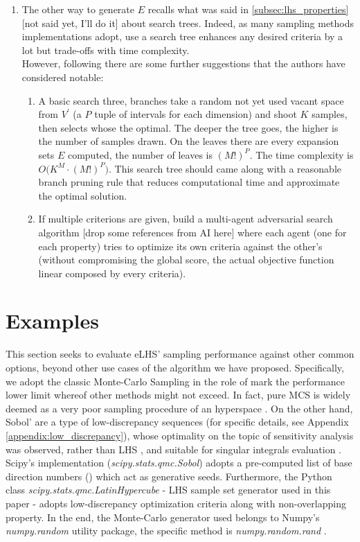 \documentclass[12pt]{extarticle}
\newcommand{\mappendixref}[1]{Appendix \ref{#1}}
\begin{document}
\begin{enumerate}
\begin{enumerate}
	\item The other way to generate $E$ recalls what was said in \cref{subsec:lhs_properties} [not said yet, I'll do it] about search trees. Indeed, as many sampling methods implementations adopt, use a search tree enhances any desired criteria by a lot but trade-offs with time complexity. \\
	However, following there are some further suggestions that the authors have considered notable:
	\begin{enumerate}
		\item A basic search three, branches take a random not yet used vacant space from $V^\prime$ (a $P$ tuple of intervals for each dimension) and shoot $K$ samples, then selects whose the optimal. The deeper the tree goes, the higher is the number of samples drawn. On the leaves there are every expansion sets $E$ computed, the number of leaves is $(M!)^P$. The time complexity is $O\big( K^M \cdot (M!)^P\big)$. This search tree should came along with a reasonable branch pruning rule that reduces computational time and approximate the optimal solution.
		
		\item If multiple criterions are given, build a multi-agent adversarial search algorithm [drop some references from AI here] where each agent (one for each property) tries to optimize its own criteria against the other's (without compromising the global score, the actual objective function linear composed by every criteria).
	
	\end{enumerate}
\end{enumerate}
\end{enumerate}


\section{Examples}
\label{sec:experiments}
This section seeks to evaluate eLHS' sampling performance against other common options, beyond other use cases of the algorithm we have proposed. Specifically, we adopt the classic Monte-Carlo Sampling in the role of mark the performance lower limit whereof other methods might not exceed. In fact, pure MCS is widely deemed as a very poor sampling procedure of an hyperspace . On the other hand, Sobol' are a type of low-discrepancy sequences (for specific details, see \mappendixref{appendix:low_discrepancy}), whose optimality on the topic of sensitivity analysis was observed, rather than LHS , and suitable for singular integrals evaluation . Scipy's implementation (\emph{scipy.stats.qmc.Sobol}) adopts a pre-computed list of base direction numbers () which act as generative seeds. Furthermore, the Python class \emph{scipy.stats.qmc.LatinHypercube} - LHS sample set generator used in this paper - adopts low-discrepancy optimization criteria along with non-overlapping property. In the end, the Monte-Carlo generator used belongs to Numpy's \emph{numpy.random} utility package, the specific method is \emph{numpy.random.rand} .
\end{document}
